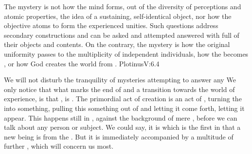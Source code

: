 The mystery is not how the mind forms, out of the diversity of perceptions and
atomic properties, the idea of a sustaining, self-identical object, nor how the
objective atoms  to form the experienced unities. Such questions
address secondary constructions and can be asked and attempted answered with
full  of their objects and contents.  On the contrary, the
mystery is how the original uniformity passes to the multiplicity of independent
individuals, how the  becomes , or how God creates the world
from . \citet{The simplex [absolute] requires no derivation; but
  any manifold, or any dual, must be dependent.}{Plotinus}{V:6.4}

\pa We will not disturb the tranquility of mysteries attempting to answer any
 We only notice that what marks the end of 
and a transition towards the world of experience, is that , is .  The primordial
act of creation is an act of , turning the 
 into something, pulling this something out of 
and letting it come forth, letting it appear.  This happens still in , against the background of mere , before we can talk
about any person or subject.  We could say, it is  which is the first
 in that a new being is  from the . But
it is immediately accompanied by a multitude of further , which
will concern us most.

